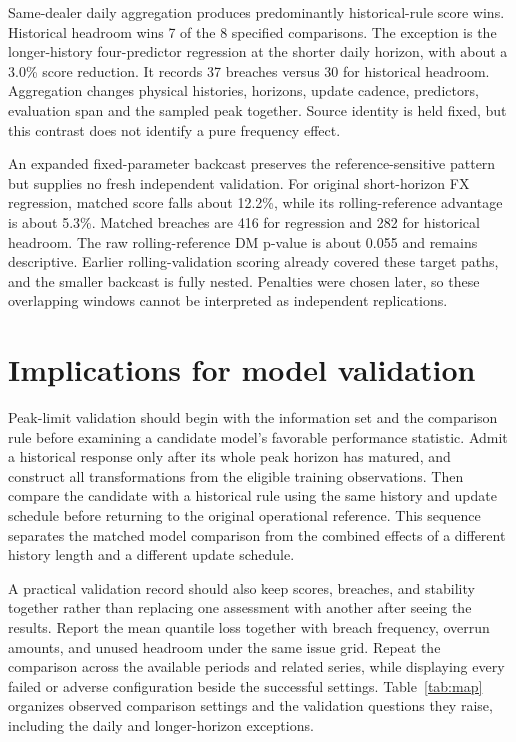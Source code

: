 \documentclass[11pt,a4paper]{article}
\begin{document}
Same-dealer daily aggregation produces predominantly historical-rule score wins. Historical headroom wins 7 of the 8 specified comparisons. The exception is the longer-history four-predictor regression at the shorter daily horizon, with about a 3.0\% score reduction. It records 37 breaches versus 30 for historical headroom. Aggregation changes physical histories, horizons, update cadence, predictors, evaluation span and the sampled peak together. Source identity is held fixed, but this contrast does not identify a pure frequency effect.

An expanded fixed-parameter backcast preserves the reference-sensitive pattern but supplies no fresh independent validation. For original short-horizon FX regression, matched score falls about 12.2\%, while its rolling-reference advantage is about 5.3\%. Matched breaches are 416 for regression and 282 for historical headroom. The raw rolling-reference DM p-value is about 0.055 and remains descriptive. Earlier rolling-validation scoring already covered these target paths, and the smaller backcast is fully nested. Penalties were chosen later, so these overlapping windows cannot be interpreted as independent replications.

\FloatBarrier

\section{Implications for model validation}\label{sec:implications}

Peak-limit validation should begin with the information set and the comparison rule before examining a candidate model's favorable performance statistic. Admit a historical response only after its whole peak horizon has matured, and construct all transformations from the eligible training observations. Then compare the candidate with a historical rule using the same history and update schedule before returning to the original operational reference. This sequence separates the matched model comparison from the combined effects of a different history length and a different update schedule.


A practical validation record should also keep scores, breaches, and stability together rather than replacing one assessment with another after seeing the results. Report the mean quantile loss together with breach frequency, overrun amounts, and unused headroom under the same issue grid. Repeat the comparison across the available periods and related series, while displaying every failed or adverse configuration beside the successful settings. Table~\ref{tab:map} organizes observed comparison settings and the validation questions they raise, including the daily and longer-horizon exceptions.
\end{document}
